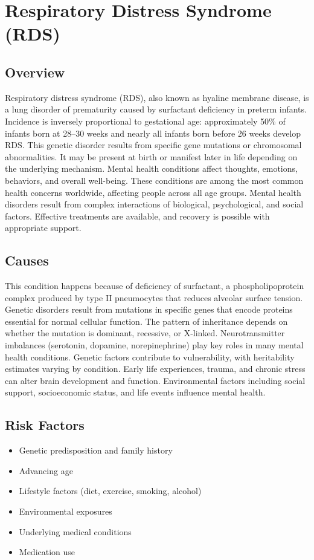\chapter{Respiratory Distress Syndrome (RDS)}
\label{sec:Respiratory Distress Syndrome}

\section{Overview}
Respiratory distress syndrome (RDS), also known as hyaline membrane disease, is a lung disorder of prematurity caused by surfactant deficiency in preterm infants. Incidence is inversely proportional to gestational age: approximately 50\% of infants born at 28--30 weeks and nearly all infants born before 26 weeks develop RDS. This genetic disorder results from specific gene mutations or chromosomal abnormalities. It may be present at birth or manifest later in life depending on the underlying mechanism. Mental health conditions affect thoughts, emotions, behaviors, and overall well-being. These conditions are among the most common health concerns worldwide, affecting people across all age groups. Mental health disorders result from complex interactions of biological, psychological, and social factors. Effective treatments are available, and recovery is possible with appropriate support.
\section{Causes}
This condition happens because of deficiency of surfactant, a phospholipoprotein complex produced by type II pneumocytes that reduces alveolar surface tension. Genetic disorders result from mutations in specific genes that encode proteins essential for normal cellular function. The pattern of inheritance depends on whether the mutation is dominant, recessive, or X-linked. Neurotransmitter imbalances (serotonin, dopamine, norepinephrine) play key roles in many mental health conditions. Genetic factors contribute to vulnerability, with heritability estimates varying by condition. Early life experiences, trauma, and chronic stress can alter brain development and function. Environmental factors including social support, socioeconomic status, and life events influence mental health.   
\section{Risk Factors}
\begin{itemize}[noitemsep]
  \item Genetic predisposition and family history
  \item Advancing age
  \item Lifestyle factors (diet, exercise, smoking, alcohol)
  \item Environmental exposures
  \item Underlying medical conditions
  \item Medication use
\end{itemize}
